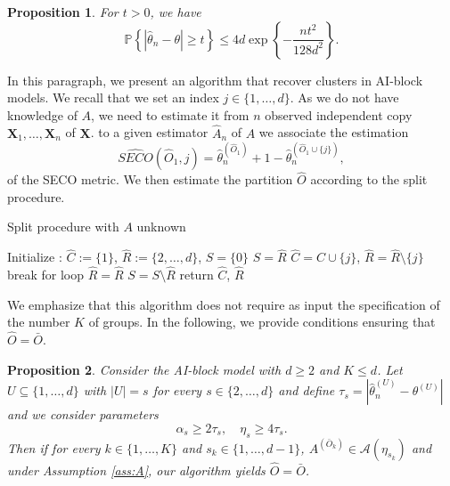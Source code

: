 \documentclass[11pt]{article}
\newtheorem{proposition}{Proposition}
\begin{document}
	\begin{proposition}
	\label{prop:concentration_inequality}
		For $t >0$, we have
		\begin{equation*}
			\mathbb{P}\left\{ |\hat{\theta}_n - \theta | \geq t \right\} \leq 4 d \exp\left\{ - \frac{nt^2}{128 d^2}\right\}.
		\end{equation*}
	\end{proposition}
	
	In this paragraph, we present an algorithm that recover clusters in AI-block models. We recall that we set an index $j \in \{1,\dots,d\}$. As we do not have knowledge of $A$, we need to estimate it from $n$ observed independent copy $\textbf{X}_1, \dots, \textbf{X}_n$ of $\textbf{X}$. to a given estimator $\hat{A}_n$ of $A$ we associate the estimation 
	\begin{equation*}
		\widehat{SECO}(\hat{O}_1, j) = \hat{\theta}^{(\hat{O}_1)}_n + 1 - \hat{\theta}^{(\hat{O}_1 \cup \{j\})}_n,
	\end{equation*}
	of the SECO metric. We then estimate the partition $\hat{O}$ according to the split procedure.
	\begin{algorithm}

\caption{Split procedure with $A$ unknown}

\begin{algorithmic}[1]
    \State Initialize : $\hat{C} := \{1\}$, $\hat{R} :=  \{2, \dots, d\}$, $S = \{0\}$
    		\State $S = \hat{R}$
    				\State $\hat{C} = \hat{C} \cup \{j\}$, $\hat{R} = \hat{R} \setminus \{j\}$
    				\State break for loop
    			\Else{}
    				\State $\hat{R} = \hat{R}$
    			\EndIf
    			\State $S = S \setminus \hat{R}$
    		\EndFor
    \EndWhile
    \State return $\hat{C}$, $\hat{R}$
\EndProcedure
\end{algorithmic}
\label{alg:rec_pratic}
\end{algorithm}
	We emphasize that this algorithm does not require as input the specification of the number $K$ of groups. In the following, we provide conditions ensuring that $\hat{O} = \bar{O}$.
	\begin{proposition}
		\label{prop:exact_recovery}
		Consider the AI-block model with $d \geq 2$ and $K \leq d$. Let $U \subseteq \{1,\dots,d\}$ with $|U| = s$ for every $s \in \{2,\dots,d\}$ and define $\tau_s = |\hat{\theta}_n^{(U)} - \theta^{(U)}|$ and we consider parameters
		\begin{equation}
			\label{eq:condition_consistent_recovery}
			\alpha_s \geq 2 \tau_s, \quad \eta_s \geq 4 \tau_s.
		\end{equation}
		Then if for every $k \in \{1,\dots, K\}$ and $s_k \in \{1, \dots, d-1\}$, $A^{(\bar{O}_k)} \in \mathcal{A}(\eta_{s_k})$ and under Assumption \ref{ass:A}, our algorithm yields $\hat{O} = \bar{O}$.
	\end{proposition}
	
\end{document}
